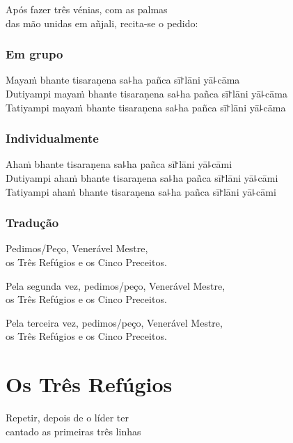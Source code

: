 \begin{instruction}
  Após fazer três vénias, com as palmas\\
  das mão unidas em añjali, recita-se o pedido:
\end{instruction}

\subsection{Em grupo}

Mayaṁ bhante tisaraṇena sa꜕ha pañca sī꜓lāni yā꜕cāma\\
Dutiyampi mayaṁ bhante tisaraṇena sa꜕ha pañca sī꜓lāni yā꜕cāma\\
Tatiyampi mayaṁ bhante tisaraṇena sa꜕ha pañca sī꜓lāni yā꜕cāma

\subsection{Individualmente}

Ahaṁ bhante tisaraṇena sa꜕ha pañca sī꜓lāni yā꜕cāmi\\
Dutiyampi ahaṁ bhante tisaraṇena sa꜕ha pañca sī꜓lāni yā꜕cāmi\\
Tatiyampi ahaṁ bhante tisaraṇena sa꜕ha pañca sī꜓lāni yā꜕cāmi

\subsection{Tradução}

\begin{english}
  Pedimos/Peço, Venerável Mestre,\\
  \vin os Três Refúgios e os Cinco Preceitos.

  Pela segunda vez, pedimos/peço, Venerável Mestre,\\
  \vin os Três Refúgios e os Cinco Preceitos.

  Pela terceira vez, pedimos/peço, Venerável Mestre,\\
  \vin os Três Refúgios e os Cinco Preceitos.
\end{english}

\clearpage
\chapter{Os Três Refúgios}

\begin{instruction}
  Repetir, depois de o líder ter\\
  cantado as primeiras três linhas
\end{instruction}

